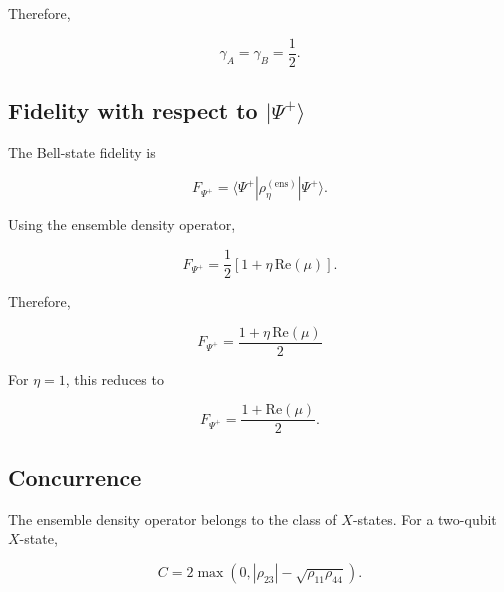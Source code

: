 Therefore,

\begin{equation}
\boxed{
\gamma_A
=
\gamma_B
=
\frac12
}.
\label{eq:appendix_ensemble_reduced_purity}
\end{equation}


\subsection*{Fidelity with respect to \texorpdfstring{\( |\Psi^+\rangle \)}{|Psi+>}}

The Bell-state fidelity is

\begin{equation}
F_{\Psi^+}
=
\langle
\Psi^+
|
\rho_{\eta}^{(\mathrm{ens})}
|
\Psi^+
\rangle.
\end{equation}

Using the ensemble density operator,

\begin{equation}
F_{\Psi^+}
=
\frac12
\left[
1
+
\eta\,\mathrm{Re}(\mu)
\right].
\end{equation}

Therefore,

\begin{equation}
\boxed{
F_{\Psi^+}
=
\frac{
1+\eta\,\mathrm{Re}(\mu)
}{2}
}
\label{eq:appendix_ensemble_fidelity}
\end{equation}

\medskip

For \( \eta=1 \), this reduces to

\begin{equation}
F_{\Psi^+}
=
\frac{
1+\mathrm{Re}(\mu)
}{2}.
\end{equation}


\subsection*{Concurrence}

The ensemble density operator belongs to the class of \(X\)-states. For a two-qubit \(X\)-state,

\begin{equation}
C
=
2
\max
\left(
0,
|\rho_{23}|
-
\sqrt{\rho_{11}\rho_{44}}
\right).
\label{eq:appendix_xstate_concurrence}
\end{equation}

